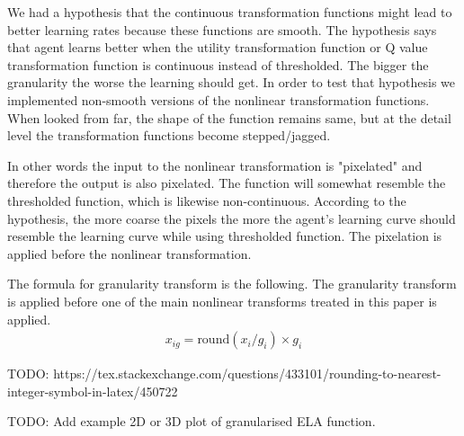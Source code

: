 

We had a hypothesis that the continuous transformation functions might lead to better learning rates because these functions are smooth. The hypothesis says that agent learns better when the utility transformation function or Q value transformation function is continuous instead of thresholded. The bigger the granularity the worse the learning should get. In order to test that hypothesis we implemented non-smooth versions of the nonlinear transformation functions. When looked from far, the shape of the function remains same, but at the detail level the transformation functions become stepped/jagged.

In other words the input to the nonlinear transformation is "pixelated" and therefore the output is also pixelated. The function will somewhat resemble the thresholded function, which is likewise non-continuous. According to the hypothesis, the more coarse the pixels the more the agent's learning curve should resemble the learning curve while using thresholded function. The pixelation is applied before the nonlinear transformation.

The formula for granularity transform is the following. The granularity transform is applied before one of the main nonlinear transforms treated in this paper is applied.
\begin{align}
x_{ig} = \text{round}(x_i / g_i) \times g_i
\end{align}

TODO: https://tex.stackexchange.com/questions/433101/rounding-to-nearest-integer-symbol-in-latex/450722

TODO: Add example 2D or 3D plot of granularised ELA function.




